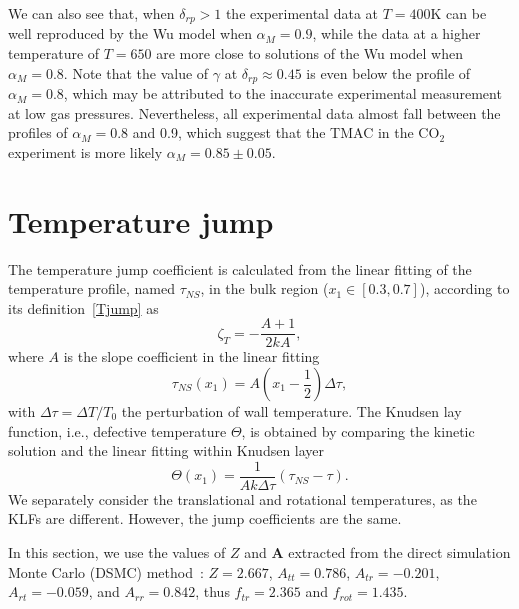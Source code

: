 We can also see that, when $\delta_{rp}>1$ the experimental data at $T=400$K can be well reproduced by the Wu model when $\alpha_M=0.9$, while the data at a higher temperature of $T=650$ are more close to solutions of the Wu model  when $\alpha_M=0.8$. Note that the value of $\gamma$ at $\delta_{rp} \approx 0.45$ is even below the profile of $\alpha_M=0.8$, which may be attributed to the inaccurate experimental measurement at low gas pressures. Nevertheless, all experimental data almost fall between the profiles of $\alpha_M=0.8$ and 0.9, which suggest that the TMAC in the CO$_2$ experiment is more likely $\alpha_M=0.85\pm 0.05$. 


\section{Temperature jump}



The temperature jump coefficient is calculated from the linear fitting of the temperature profile, named $\tau_{NS}$, in the bulk region ($x_1\in[0.3,0.7]$), according to its definition~\eqref{Tjump} as
\begin{equation}
\zeta_T=-\frac{A+1}{2kA},
\end{equation}
where $A$ is the slope coefficient in the linear fitting
\begin{equation}
\tau_{NS}\left(x_1\right)=A\left(x_1-\frac{1}{2}\right)\Delta\tau,
\end{equation}
with $\Delta\tau=\Delta T/T_0$ the perturbation of wall temperature. The Knudsen lay function, i.e., defective temperature $\Theta$, is obtained by comparing the kinetic solution and the linear fitting within Knudsen layer
\begin{equation}
\Theta\left(x_1\right)=\frac{1}{Ak\Delta\tau}\left(\tau_{NS}-\tau\right).
\end{equation}
We separately consider the translational and rotational temperatures, as the KLFs are different. However,  the jump coefficients are the same. 


In this section, we use the values of $Z$ and $\bm{A}$ extracted from the direct simulation Monte Carlo (DSMC) method~\cite{Wu2020JFM,Li2021JFM}:  $Z=2.667$, $A_{tt}=0.786$, $A_{tr}=-0.201$, $A_{rt}=-0.059$, and $A_{rr}=0.842$, thus $f_{tr}=2.365$ and $f_{rot}=1.435$. %


